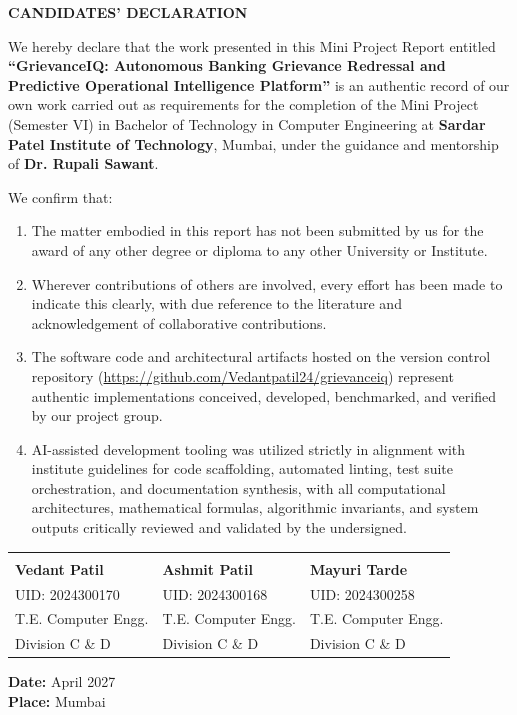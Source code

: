 \newpage
\thispagestyle{plain}
\begin{center}
\Large\textbf{CANDIDATES' DECLARATION}
\end{center}
\vspace{1cm}

\noindent We hereby declare that the work presented in this Mini Project Report entitled \textbf{``GrievanceIQ: Autonomous Banking Grievance Redressal and Predictive Operational Intelligence Platform''} is an authentic record of our own work carried out as requirements for the completion of the Mini Project (Semester VI) in Bachelor of Technology in Computer Engineering at \textbf{Sardar Patel Institute of Technology}, Mumbai, under the guidance and mentorship of \textbf{Dr. Rupali Sawant}.

\vspace{0.5cm}
\noindent We confirm that:
\begin{enumerate}
    \item The matter embodied in this report has not been submitted by us for the award of any other degree or diploma to any other University or Institute.
    \item Wherever contributions of others are involved, every effort has been made to indicate this clearly, with due reference to the literature and acknowledgement of collaborative contributions.
    \item The software code and architectural artifacts hosted on the version control repository (\url{https://github.com/Vedantpatil24/grievanceiq}) represent authentic implementations conceived, developed, benchmarked, and verified by our project group.
    \item AI-assisted development tooling was utilized strictly in alignment with institute guidelines for code scaffolding, automated linting, test suite orchestration, and documentation synthesis, with all computational architectures, mathematical formulas, algorithmic invariants, and system outputs critically reviewed and validated by the undersigned.
\end{enumerate}

\vspace{2.5cm}

\noindent
\begin{tabular}{p{5cm}p{5cm}p{5cm}}
\dotfill & \dotfill & \dotfill \\
\textbf{Vedant Patil} & \textbf{Ashmit Patil} & \textbf{Mayuri Tarde} \\
UID: 2024300170 & UID: 2024300168 & UID: 2024300258 \\
T.E. Computer Engg. & T.E. Computer Engg. & T.E. Computer Engg. \\
Division C \& D & Division C \& D & Division C \& D \\
\end{tabular}

\vspace{2cm}

\noindent \textbf{Date:} April 2027 \\
\textbf{Place:} Mumbai
